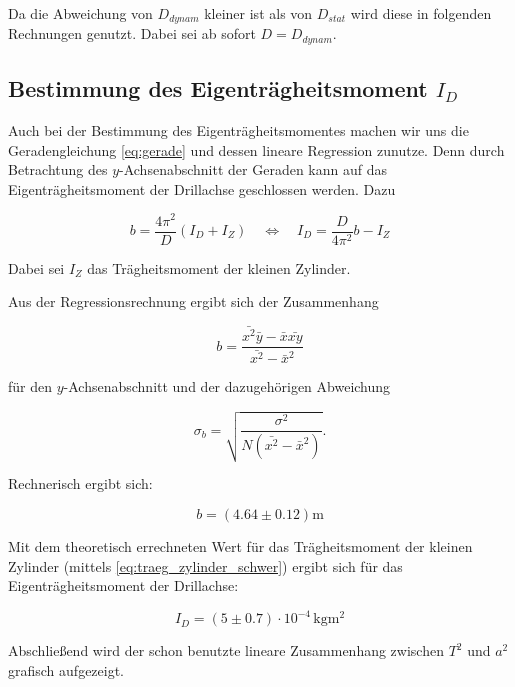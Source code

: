 Da die Abweichung von $D_{dynam}$ kleiner ist als von $D_{stat}$ wird
diese in folgenden Rechnungen genutzt.
Dabei sei ab sofort $D=D_{dynam}$.


\subsection{Bestimmung des Eigenträgheitsmoment $I_D$}

Auch bei der Bestimmung des Eigenträgheitsmomentes machen wir uns die
Geradengleichung \eqref{eq:gerade} und dessen lineare Regression zunutze.
Denn durch Betrachtung des $y$-Achsenabschnitt der Geraden kann auf das Eigenträgheitsmoment der Drillachse geschlossen werden. %
Dazu

\begin{equation*}
b=\frac{4\pi^2}{D}\left(I_D+I_Z\right) \quad \Leftrightarrow \quad I_D=\frac{D}{4\pi^2}b-I_Z
\end{equation*}

Dabei sei $I_Z$ das Trägheitsmoment der kleinen Zylinder.%

Aus der Regressionsrechnung ergibt sich der Zusammenhang

\begin{equation*}
b=\frac{\bar{x^2}\bar{y}-\bar{x}\bar{xy}}{\bar{x^2}-\bar{x}^2}
\end{equation*}

für den $y$-Achsenabschnitt und der dazugehörigen Abweichung

\begin{equation*}
\sigma_b=\sqrt{\frac{\sigma^2}{N\left(\bar{x^2}-\bar{x}^2\right)}}.
\end{equation*}

Rechnerisch ergibt sich:

\begin{equation}
\label{eq:y_achsenabschnitt}
b=\left(\num{4.64}\pm\num{0.12}\right) \si{\meter}
\end{equation}

Mit dem theoretisch errechneten Wert für das Trägheitsmoment der kleinen Zylinder
(mittels \eqref{eq:traeg_zylinder_schwer}) ergibt sich für das
Eigenträgheitsmoment der Drillachse:

\begin{equation}
\label{eq:eigentraegheitsmoment}
I_D=\left(\num{5}\pm\num{0.7}\right)\cdot{10^{-4}} \,\si{\kilogram\meter\squared}
\end{equation}


Abschließend wird der schon benutzte lineare Zusammenhang zwischen $T^2$ und $a^2$ grafisch aufgezeigt.

